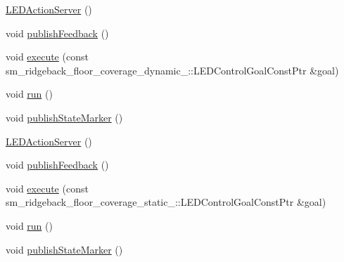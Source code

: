 \begin{DoxyCompactItemize}
\hyperlink{classLEDActionServer_a6978c43940438b9fd8bfcd6b443092d3}{L\+E\+D\+Action\+Server} ()
\item 
void \hyperlink{classLEDActionServer_a25c93d4e7ecdacbb4f5b090d7789aa36}{publish\+Feedback} ()
\item 
void \hyperlink{classLEDActionServer_aa7de924a8ea5f74b85d14782f4661a67}{execute} (const sm\+\_\+ridgeback\+\_\+floor\+\_\+coverage\+\_\+dynamic\+\_\+::\+L\+E\+D\+Control\+Goal\+Const\+Ptr \&goal)
\item 
void \hyperlink{classLEDActionServer_ae8e1b2d4bf0a85eec3ffd1c7d4f08490}{run} ()
\item 
void \hyperlink{classLEDActionServer_a73bb754ac2347c50660624ad92315895}{publish\+State\+Marker} ()
\item 
\hyperlink{classLEDActionServer_a6978c43940438b9fd8bfcd6b443092d3}{L\+E\+D\+Action\+Server} ()
\item 
void \hyperlink{classLEDActionServer_a25c93d4e7ecdacbb4f5b090d7789aa36}{publish\+Feedback} ()
\item 
void \hyperlink{classLEDActionServer_adf0a5d17104919195a605c89ee488af1}{execute} (const sm\+\_\+ridgeback\+\_\+floor\+\_\+coverage\+\_\+static\+\_\+::\+L\+E\+D\+Control\+Goal\+Const\+Ptr \&goal)
\item 
void \hyperlink{classLEDActionServer_ae8e1b2d4bf0a85eec3ffd1c7d4f08490}{run} ()
\item 
void \hyperlink{classLEDActionServer_a73bb754ac2347c50660624ad92315895}{publish\+State\+Marker} ()
\end{DoxyCompactItemize}
